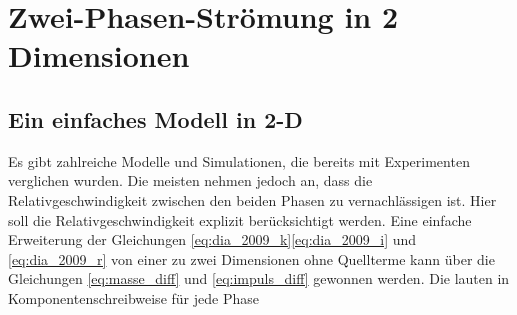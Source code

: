\section{Zwei-Phasen-Strömung in 2 Dimensionen}

\subsection{Ein einfaches Modell in 2-D}

Es gibt zahlreiche Modelle und Simulationen, die bereits mit
Experimenten verglichen wurden. Die meisten nehmen jedoch an, dass die
Relativgeschwindigkeit zwischen den beiden Phasen zu vernachlässigen
ist. Hier soll die Relativgeschwindigkeit explizit berücksichtigt
werden. Eine einfache Erweiterung der Gleichungen
\ref{eq:dia_2009_k}\ref{eq:dia_2009_i} und \ref{eq:dia_2009_r} von
einer zu zwei Dimensionen ohne Quellterme kann über die Gleichungen
\ref{eq:masse_diff} und \ref{eq:impuls_diff} gewonnen werden. Die
lauten in Komponentenschreibweise für jede Phase


